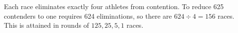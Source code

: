 Each race eliminates exactly four athletes from contention. To reduce 625 contenders to one requires 624 eliminations, so there are $624\div4=\boxed{156}$ races. This is attained in rounds of $125,25,5,1$ races.
